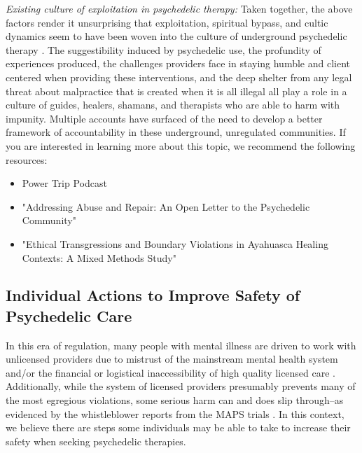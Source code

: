 \documentclass[12pt,letterpaper]{book}
\begin{document}
\textit{Existing culture of exploitation in psychedelic therapy:}
Taken together, the above factors render it unsurprising that exploitation, spiritual bypass, and cultic dynamics seem to have been woven into the culture of underground psychedelic therapy \cite{powerTrip,abuseLetter,brown2020ethical}. The suggestibility induced by psychedelic use, the profundity of experiences produced, the challenges providers face in staying humble and client centered when providing these interventions, and the deep shelter from any legal threat about malpractice that is created when it is all illegal all play a role in a culture of guides, healers, shamans, and therapists who are able to harm with impunity. Multiple accounts have surfaced of the need to develop a better framework of accountability in these underground, unregulated communities.
If you are interested in learning more about this topic, we recommend the following resources:
\begin{itemize}
    \item Power Trip Podcast \cite{powerTrip}
    \item "Addressing Abuse and Repair: An Open Letter to the Psychedelic Community" \cite{abuseLetter}
    \item "Ethical Transgressions and Boundary Violations in Ayahuasca Healing Contexts: A Mixed Methods Study" \cite{brown2020ethical}
\end{itemize}

\subsection*{Individual Actions to Improve Safety of Psychedelic Care}
\label{sec:safetyActions}

In this era of regulation, many people with mental illness are driven to work with unlicensed providers due to mistrust of the mainstream mental health system and/or the financial or logistical inaccessibility of high quality licensed care \cite{aboujaoude2020coachingVSTherapy}. Additionally, while the system of licensed providers presumably prevents many of the most egregious violations, some serious harm can and does slip through–as evidenced by the whistleblower reports from the MAPS trials \cite{devenotCommittee}. In this context, we believe there are steps some individuals may be able to take to increase their safety when seeking psychedelic therapies.
\end{document}
